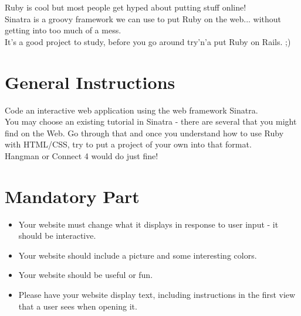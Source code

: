 \documentclass{42-en}
\begin{document}
Ruby is cool but most people get hyped about putting stuff online!\\

Sinatra is a groovy framework we can use to put Ruby on the web... without getting into too much of a mess.\\

It's a good project to study, before you go around try'n'a put Ruby on Rails. ;) 


\chapter{General Instructions}

Code an interactive web application using the web framework Sinatra.\\

You may choose an existing tutorial in Sinatra - there are several that you might find on the Web. Go through that and once you understand how to use Ruby with HTML/CSS, try to put a project of your own into that format.\\

Hangman or Connect 4 would do just fine!


\chapter{Mandatory Part}

\begin{itemize}

\item Your website must change what it displays in response to user input - it should be interactive.
\item Your website should include a picture and some interesting colors.
\item Your website should be useful or fun.
\item Please have your website display text, including instructions in the first view that a user sees when opening it. 

\end{itemize}
\end{document}
